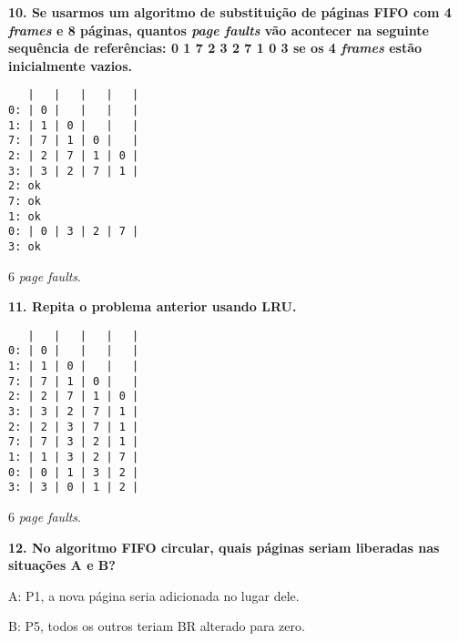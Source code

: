 \documentclass[12pt,a4paper]{article}
\newcommand{\pergunta}[1]{\noindent \textbf{#1}}
\begin{document}
\pergunta{10. Se usarmos um algoritmo de substituição de páginas FIFO com 4 
\textsl{frames} e 8 páginas, quantos \textsl{page faults} vão acontecer na 
seguinte sequência de 
referências: 0 1 7 2 3 2 7 1 0 3 se os 4 \textsl{frames} estão inicialmente 
vazios.}

\begin{verbatim}
   |   |   |   |   |
0: | 0 |   |   |   |
1: | 1 | 0 |   |   |
7: | 7 | 1 | 0 |   |
2: | 2 | 7 | 1 | 0 |
3: | 3 | 2 | 7 | 1 |
2: ok
7: ok
1: ok
0: | 0 | 3 | 2 | 7 |
3: ok
\end{verbatim}

6 \textsl{page faults}.

\clearpage
\pergunta{11. Repita o problema anterior usando LRU.}

\begin{verbatim}
   |   |   |   |   |
0: | 0 |   |   |   |
1: | 1 | 0 |   |   |
7: | 7 | 1 | 0 |   |
2: | 2 | 7 | 1 | 0 |
3: | 3 | 2 | 7 | 1 |
2: | 2 | 3 | 7 | 1 |
7: | 7 | 3 | 2 | 1 |
1: | 1 | 3 | 2 | 7 |
0: | 0 | 1 | 3 | 2 |
3: | 3 | 0 | 1 | 2 |
\end{verbatim}

6 \textsl{page faults}.

\pergunta{12. No algoritmo FIFO circular, quais páginas seriam liberadas nas 
situações A e B?}

A: P1, a nova página seria adicionada no lugar dele.

B: P5, todos os outros teriam BR alterado para zero.
\end{document}
